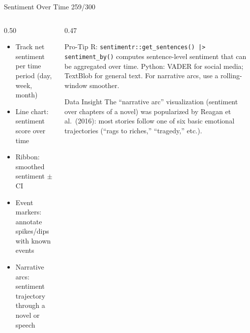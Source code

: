 \documentclass[10pt]{beamer}
\newcommand{\smark}[1]{\hfill{\scriptsize\color{codegray}#1}}
\begin{document}
\begin{frame}{Sentiment Over Time}
\smark{259/300}
\begin{columns}[T]
\begin{column}{0.50\textwidth}
\begin{itemize}
    \item Track net sentiment per time period (day, week, month)
    \item Line chart: sentiment score over time
    \item Ribbon: smoothed sentiment $\pm$ CI
    \item Event markers: annotate spikes/dips with known events
    \item Narrative arcs: sentiment trajectory through a novel or speech
\end{itemize}
\end{column}
\begin{column}{0.47\textwidth}
\begin{alertblock}{Pro-Tip}
    \scriptsize R: \texttt{sentimentr::get\_sentences() |> sentiment\_by()} computes sentence-level sentiment that can be aggregated over time. Python: VADER for social media; TextBlob for general text. For narrative arcs, use a rolling-window smoother.
\end{alertblock}
\vspace{0.1cm}
\begin{exampleblock}{Data Insight}
    \scriptsize The ``narrative arc'' visualization (sentiment over chapters of a novel) was popularized by Reagan et al.\ (2016): most stories follow one of six basic emotional trajectories (``rags to riches,'' ``tragedy,'' etc.).
\end{exampleblock}
\end{column}
\end{columns}
\end{frame}
\end{document}
